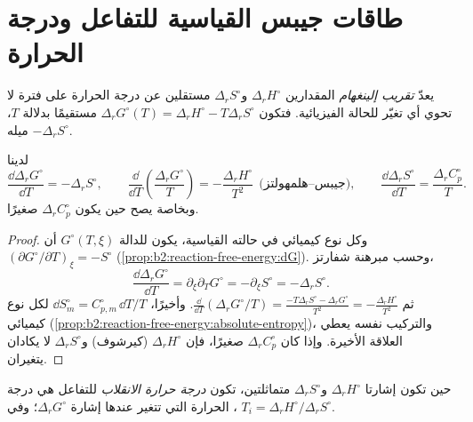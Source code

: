 \section{طاقات جيبس القياسية للتفاعل ودرجة الحرارة}

\begin{definition}\label{def:b2:reaction-free-energy:ellingham-approximation}
يعدّ \emph{تقريب إلينغهام} المقدارين
$\Delta_r H^\circ$ و$\Delta_r S^\circ$ مستقلين عن درجة الحرارة
على فترة لا تحوي أي تغيّر للحالة الفيزيائية. فتكون $\Delta_r G^\circ(T)
= \Delta_r H^\circ - T\Delta_r S^\circ$ مستقيمًا بدلالة $T$، ميله
$-\Delta_r S^\circ$.
\end{definition}

\begin{proposition}\label{prop:b2:reaction-free-energy:gibbs-helmholtz}
لدينا
\[
  \frac{\dd\Delta_r G^\circ}{\dd T} = -\Delta_r S^\circ, \qquad
  \frac{\dd}{\dd T}\!\left(\frac{\Delta_r G^\circ}{T}\right) =
  -\frac{\Delta_r H^\circ}{T^2}\ \ \text{(جيبس--هلمهولتز)}, \qquad
  \frac{\dd\Delta_r S^\circ}{\dd T} = \frac{\Delta_r C^\circ_p}{T}.
\]
وبخاصة يصح  حين يكون $\Delta_r C^\circ_p$
صغيرًا.
\end{proposition}

\begin{proof}
وكل نوع كيميائي في حالته القياسية، يكون للدالة $G^\circ(T, \xi)$ أن $(\partial
G^\circ/\partial T)_\xi = -S^\circ$ (\cref{prop:b2:reaction-free-energy:dG}).
وحسب مبرهنة شفارتز،
\[
  \frac{\dd\Delta_r G^\circ}{\dd T} = \partial_\xi\partial_T G^\circ =
  -\partial_\xi S^\circ = -\Delta_r S^\circ .
\] ثم $\frac{\dd}{\dd
T}(\Delta_r G^\circ/T) = \frac{-T\Delta_r S^\circ - \Delta_r G^\circ}{T^2} =
-\frac{\Delta_r H^\circ}{T^2}$. وأخيرًا، $\dd S^\circ_m = C^\circ_{p,m}\,\dd
T/T$ لكل نوع كيميائي (\cref{prop:b2:reaction-free-energy:absolute-entropy})،
والتركيب نفسه يعطي العلاقة الأخيرة. وإذا كان $\Delta_r C^\circ_p$
صغيرًا، فإن $\Delta_r H^\circ$ (كيرشوف) و$\Delta_r S^\circ$ لا يكادان يتغيران.
\end{proof}

\begin{definition}\label{def:b2:reaction-free-energy:inversion-temperature}
حين تكون إشارتا $\Delta_r H^\circ$ و$\Delta_r S^\circ$ متماثلتين، تكون
\emph{درجة حرارة الانقلاب} للتفاعل هي
درجة الحرارة التي تتغير عندها إشارة $\Delta_r G^\circ$؛ وفي ،
$T_i = \Delta_r H^\circ/\Delta_r S^\circ$.
\end{definition}


